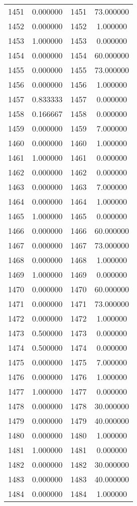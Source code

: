 \documentclass[12pt]{article}
\begin{document}
\begin{longtable}{@{}cccc@{}}
1451 & 0.000000 & 1451 & 73.000000 \\
1452 & 0.000000 & 1452 & 1.000000 \\
1453 & 1.000000 & 1453 & 0.000000 \\
1454 & 0.000000 & 1454 & 60.000000 \\
1455 & 0.000000 & 1455 & 73.000000 \\
1456 & 0.000000 & 1456 & 1.000000 \\
1457 & 0.833333 & 1457 & 0.000000 \\
1458 & 0.166667 & 1458 & 0.000000 \\
1459 & 0.000000 & 1459 & 7.000000 \\
1460 & 0.000000 & 1460 & 1.000000 \\
1461 & 1.000000 & 1461 & 0.000000 \\
1462 & 0.000000 & 1462 & 0.000000 \\
1463 & 0.000000 & 1463 & 7.000000 \\
1464 & 0.000000 & 1464 & 1.000000 \\
1465 & 1.000000 & 1465 & 0.000000 \\
1466 & 0.000000 & 1466 & 60.000000 \\
1467 & 0.000000 & 1467 & 73.000000 \\
1468 & 0.000000 & 1468 & 1.000000 \\
1469 & 1.000000 & 1469 & 0.000000 \\
1470 & 0.000000 & 1470 & 60.000000 \\
1471 & 0.000000 & 1471 & 73.000000 \\
1472 & 0.000000 & 1472 & 1.000000 \\
1473 & 0.500000 & 1473 & 0.000000 \\
1474 & 0.500000 & 1474 & 0.000000 \\
1475 & 0.000000 & 1475 & 7.000000 \\
1476 & 0.000000 & 1476 & 1.000000 \\
1477 & 1.000000 & 1477 & 0.000000 \\
1478 & 0.000000 & 1478 & 30.000000 \\
1479 & 0.000000 & 1479 & 40.000000 \\
1480 & 0.000000 & 1480 & 1.000000 \\
1481 & 1.000000 & 1481 & 0.000000 \\
1482 & 0.000000 & 1482 & 30.000000 \\
1483 & 0.000000 & 1483 & 40.000000 \\
1484 & 0.000000 & 1484 & 1.000000 \\

\end{longtable}
\end{document}
